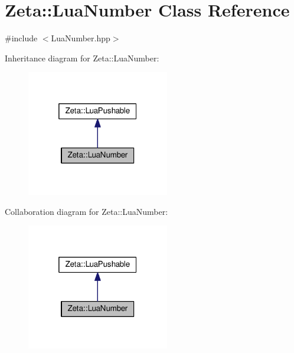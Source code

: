 \hypertarget{classZeta_1_1LuaNumber}{\section{Zeta\+:\+:Lua\+Number Class Reference}
\label{classZeta_1_1LuaNumber}
}


{\ttfamily \#include $<$Lua\+Number.\+hpp$>$}



Inheritance diagram for Zeta\+:\+:Lua\+Number\+:\nopagebreak
\begin{figure}[H]
\begin{center}
\leavevmode
\includegraphics[width=176pt]{classZeta_1_1LuaNumber__inherit__graph}
\end{center}
\end{figure}


Collaboration diagram for Zeta\+:\+:Lua\+Number\+:\nopagebreak
\begin{figure}[H]
\begin{center}
\leavevmode
\includegraphics[width=176pt]{classZeta_1_1LuaNumber__coll__graph}
\end{center}
\end{figure}
